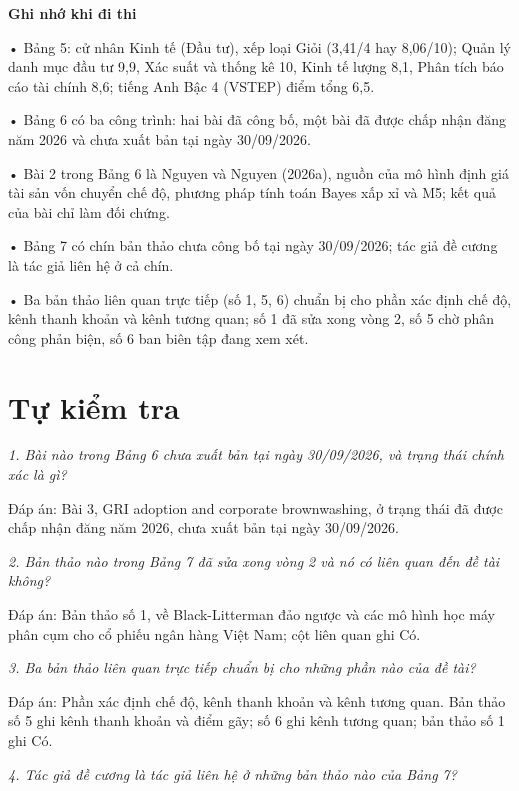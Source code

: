 \begin{tcolorbox}[breakable]
\textbf{Ghi nhớ khi đi thi}

• Bảng 5: cử nhân Kinh tế (Đầu tư), xếp loại Giỏi (3,41/4 hay 8,06/10); Quản lý danh mục đầu tư 9,9, Xác suất và thống kê 10, Kinh tế lượng 8,1, Phân tích báo cáo tài chính 8,6; tiếng Anh Bậc 4 (VSTEP) điểm tổng 6,5.

• Bảng 6 có ba công trình: hai bài đã công bố, một bài đã được chấp nhận đăng năm 2026 và chưa xuất bản tại ngày 30/09/2026.

• Bài 2 trong Bảng 6 là Nguyen và Nguyen (2026a), nguồn của mô hình định giá tài sản vốn chuyển chế độ, phương pháp tính toán Bayes xấp xỉ và M5; kết quả của bài chỉ làm đối chứng.

• Bảng 7 có chín bản thảo chưa công bố tại ngày 30/09/2026; tác giả đề cương là tác giả liên hệ ở cả chín.

• Ba bản thảo liên quan trực tiếp (số 1, 5, 6) chuẩn bị cho phần xác định chế độ, kênh thanh khoản và kênh tương quan; số 1 đã sửa xong vòng 2, số 5 chờ phân công phản biện, số 6 ban biên tập đang xem xét.
\end{tcolorbox}

\section{Tự kiểm tra}

{\itshape 1. Bài nào trong Bảng 6 chưa xuất bản tại ngày 30/09/2026, và trạng thái chính xác là gì?\par}

Đáp án: Bài 3, GRI adoption and corporate brownwashing, ở trạng thái đã được chấp nhận đăng năm 2026, chưa xuất bản tại ngày 30/09/2026.

{\itshape 2. Bản thảo nào trong Bảng 7 đã sửa xong vòng 2 và nó có liên quan đến đề tài không?\par}

Đáp án: Bản thảo số 1, về Black-Litterman đảo ngược và các mô hình học máy phân cụm cho cổ phiếu ngân hàng Việt Nam; cột liên quan ghi Có.

{\itshape 3. Ba bản thảo liên quan trực tiếp chuẩn bị cho những phần nào của đề tài?\par}

Đáp án: Phần xác định chế độ, kênh thanh khoản và kênh tương quan. Bản thảo số 5 ghi kênh thanh khoản và điểm gãy; số 6 ghi kênh tương quan; bản thảo số 1 ghi Có.

{\itshape 4. Tác giả đề cương là tác giả liên hệ ở những bản thảo nào của Bảng 7?\par}

